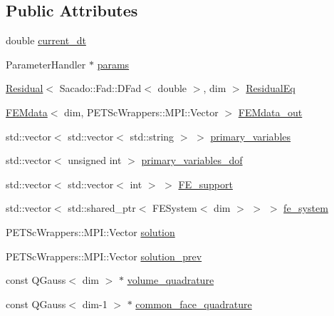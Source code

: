 \subsection*{Public Attributes}
\begin{DoxyCompactItemize}
\item 
double \mbox{\hyperlink{classinit_bound_val_probs_a68c7b36b181a92a91945137308e74a6d}{current\+\_\+dt}}
\item 
Parameter\+Handler $\ast$ \mbox{\hyperlink{classinit_bound_val_probs_a31d5e7a5228d9d55ba00fae854fcfaa0}{params}}
\item 
\mbox{\hyperlink{class_residual}{Residual}}$<$ Sacado\+::\+Fad\+::\+D\+Fad$<$ double $>$, dim $>$ \mbox{\hyperlink{classinit_bound_val_probs_adeaa7307c79088ccde0e35feb27eb0b0}{Residual\+Eq}}
\item 
\mbox{\hyperlink{class_f_e_mdata}{F\+E\+Mdata}}$<$ dim, P\+E\+T\+Sc\+Wrappers\+::\+M\+P\+I\+::\+Vector $>$ \mbox{\hyperlink{classinit_bound_val_probs_af7b22336bf40c3a2865dff2cb708136d}{F\+E\+Mdata\+\_\+out}}
\item 
std\+::vector$<$ std\+::vector$<$ std\+::string $>$ $>$ \mbox{\hyperlink{classinit_bound_val_probs_a4933860ad833b7b9bd2b8effee5c36d6}{primary\+\_\+variables}}
\item 
std\+::vector$<$ unsigned int $>$ \mbox{\hyperlink{classinit_bound_val_probs_a20e37946082ad677ffab164a6dead8b3}{primary\+\_\+variables\+\_\+dof}}
\item 
std\+::vector$<$ std\+::vector$<$ int $>$ $>$ \mbox{\hyperlink{classinit_bound_val_probs_ab0e06106bfe2ab795399d91169290e8a}{F\+E\+\_\+support}}
\item 
std\+::vector$<$ std\+::shared\+\_\+ptr$<$ F\+E\+System$<$ dim $>$ $>$ $>$ \mbox{\hyperlink{classinit_bound_val_probs_abeb9cdd6078108148320406c68bfa0d1}{fe\+\_\+system}}
\item 
P\+E\+T\+Sc\+Wrappers\+::\+M\+P\+I\+::\+Vector \mbox{\hyperlink{classinit_bound_val_probs_ae539da5c193ce7d8d07f654067f111ca}{solution}}
\item 
P\+E\+T\+Sc\+Wrappers\+::\+M\+P\+I\+::\+Vector \mbox{\hyperlink{classinit_bound_val_probs_ab5b94542feace0c45c2c69696ce9a266}{solution\+\_\+prev}}
\item 
const Q\+Gauss$<$ dim $>$ $\ast$ \mbox{\hyperlink{classinit_bound_val_probs_a7e2363a91f6f1626f463f3a06108c03b}{volume\+\_\+quadrature}}
\item 
const Q\+Gauss$<$ dim-\/1 $>$ $\ast$ \mbox{\hyperlink{classinit_bound_val_probs_af302403bba9078de92d05b4cbe6f44dd}{common\+\_\+face\+\_\+quadrature}}

\end{DoxyCompactItemize}
